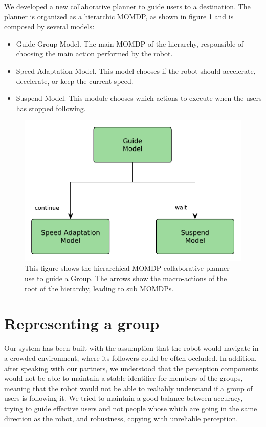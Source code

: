 We developed a new collaborative planner to guide users to a destination. The planner is organized as a hierarchic MOMDP, as shown in figure \ref{fig:spencer-guide_planner} and is composed by several models:
\begin{itemize}
\item Guide Group Model. The main MOMDP of the hierarchy, responsible of choosing the main action performed by the robot.
\item Speed Adaptation Model. This model chooses if the robot should accelerate, decelerate, or keep the current speed.
\item Suspend Model. This module chooses which actions to execute when the users has stopped following.
\end{itemize}



\begin{figure}[ht!]
	\centering
	\includegraphics[scale=0.45]{img/case_study/spencer/guide_planner.pdf}
	\caption[Collaborative planner for guiding]{This figure shows the hierarchical MOMDP collaborative planner use to guide a Group. The arrows show the macro-actions of the root of the hierarchy, leading to sub MOMDPs.}
	\label{fig:spencer-guide_planner}
\end{figure}

\section{Representing a group}
Our system has been built with the assumption that the robot would navigate in a crowded environment, where its followers could be often occluded. In addition, after speaking with our partners, we understood that the perception components would not be able to maintain a stable identifier for members of the groups, meaning that the robot would not be able to realiably understand if a group of users is following it. We tried to maintain a good balance between accuracy, trying to guide effective users and not people whose which are going in the same direction as the robot, and robustness, copying with unreliable perception.

